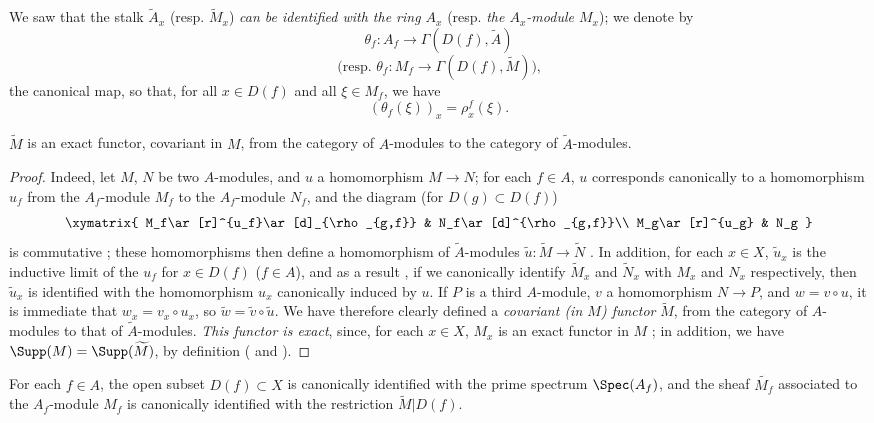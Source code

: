 We saw  that the stalk $\widetilde{A}_x$ (resp. $\widetilde{M}_x$) \emph{can be identified with the ring $A_x$} (resp. \emph{the $A_x$-module $M_x$});
we denote by
\[
  \theta_f:A_f\to\Gamma(D(f),\widetilde{A})
\]
\[
  \text{(resp. }\theta_f:M_f\to\Gamma(D(f),\widetilde{M})\text{),}
\]
the canonical map, so that, for all $x\in D(f)$ and all $\xi\in M_f$, we have
\[
  (\theta_f(\xi))_x=\rho_x^f(\xi).
  \tag{1.3.4.1}
  \label{I.1.3.4.1}
\]

\begin{proposition}[1.3.5]
\label{I.1.3.5}
$\widetilde{M}$ is an exact functor, covariant in $M$, from the category of $A$-modules to the category of $\widetilde{A}$-modules.
\end{proposition}

\begin{proof}
Indeed, let $M$, $N$ be two $A$-modules, and $u$ a homomorphism $M\to N$;
for each $f\in A$, $u$ corresponds canonically to a homomorphism $u_f$ from the $A_f$-module $M_f$ to the $A_f$-module $N_f$, and the diagram (for $D(g)\subset D(f)$)
\[
  \xymatrix{
    M_f\ar[r]^{u_f}\ar[d]_{\rho_{g,f}} & N_f\ar[d]^{\rho_{g,f}}\\
    M_g\ar[r]^{u_g} & N_g
  }
\]
is commutative ;
these homomorphisms then define a homomorphism of $\widetilde{A}$-modules $\widetilde{u}:\widetilde{M}\to\widetilde{N}$ .
In addition, for each $x\in X$, $\widetilde{u}_x$ is the inductive limit of the $u_f$ for $x\in D(f)$ ($f\in A$), and as a result , if we canonically identify $\widetilde{M}_x$ and $\widetilde{N}_x$ with $M_x$ and $N_x$ respectively, then $\widetilde{u}_x$ is identified with the homomorphism $u_x$ canonically induced by $u$.
If $P$ is a third $A$-module, $v$ a homomorphism $N\to P$, and $w=v\circ u$, it is immediate that $w_x=v_x\circ u_x$, so $\widetilde{w}=\widetilde{v}\circ\widetilde{u}$.
We have therefore clearly defined a \emph{covariant (in $M$) functor} $\widetilde{M}$, from the category of $A$-modules to that of $\widetilde{A}$-modules.
\emph{This functor is exact}, since, for each $x\in X$, $M_x$ is an exact functor in $M$ ;
in addition, we have $\Supp(M)=\Supp(\widetilde{M})$, by definition ( and ).
\end{proof}

\begin{proposition}[1.3.6]
\label{I.1.3.6}
For each $f\in A$, the open subset $D(f)\subset X$ is canonically identified with the prime spectrum $\Spec(A_f)$, and the sheaf $\widetilde{M_f}$ associated to the $A_f$-module $M_f$ is canonically identified with the restriction $\widetilde{M}|D(f)$.
\end{proposition}

